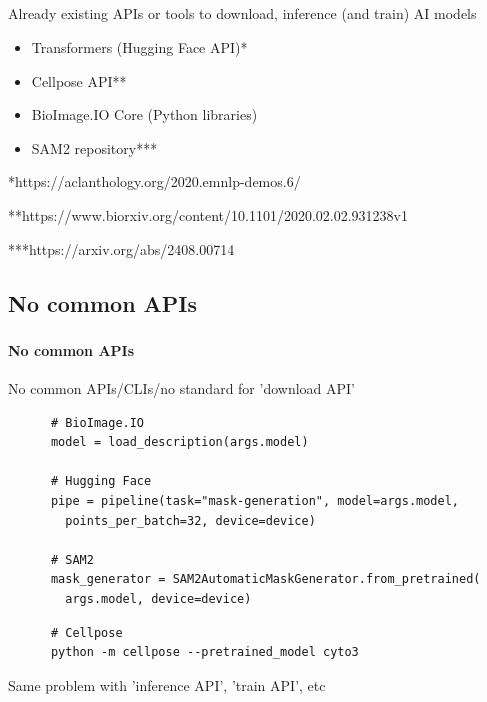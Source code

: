 \subsection{\slidetitle}
\begin{frame}
  \frametitle{\sectiontitle}
  \framesubtitle{\slidetitle}

  Already existing APIs or tools to download, inference (and train) AI models
  \begin{itemize}
    \item Transformers (Hugging Face API)*
    \item Cellpose API**
    \item BioImage.IO Core (Python libraries)
    \item SAM2 repository***
  \end{itemize}

  \bigskip
  \bigskip

  *https://aclanthology.org/2020.emnlp-demos.6/

  **https://www.biorxiv.org/content/10.1101/2020.02.02.931238v1

  ***https://arxiv.org/abs/2408.00714
\end{frame}

\def\slidetitle{No common APIs}

\subsection{\slidetitle}
\begin{frame}[containsverbatim]
  \frametitle{\sectiontitle}
  \framesubtitle{\slidetitle}

  No common APIs/CLIs/no standard for 'download API'

  \begin{listing}[H]
    \begin{verbatim}
      # BioImage.IO
      model = load_description(args.model)

      # Hugging Face
      pipe = pipeline(task="mask-generation", model=args.model,
        points_per_batch=32, device=device)

      # SAM2
      mask_generator = SAM2AutomaticMaskGenerator.from_pretrained(
        args.model, device=device)
    \end{verbatim}

    \begin{verbatim}
      # Cellpose
      python -m cellpose --pretrained_model cyto3
    \end{verbatim}
  \end{listing}

  Same problem with 'inference API', 'train API', etc

\end{frame}

